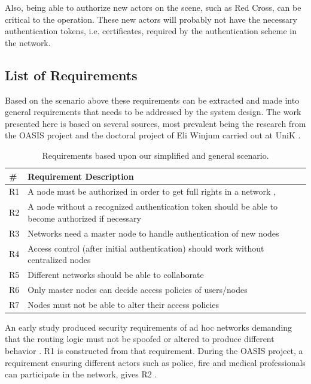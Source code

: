 Also, being able to authorize new actors on the scene, such as Red Cross, can be
critical to the operation. These new actors will probably not have the necessary
authentication tokens, i.e. certificates, required by the authentication scheme
in the network.

\subsection{List of Requirements}
Based on the scenario above these requirements can be extracted and made into
general requirements that needs to be addressed by the system design. The work
presented here is based on several sources, most prevalent being the research
from the OASIS project \cite{oasis_report} \cite{5683058} \cite{nyre2009secure}
and the doctoral project of Eli Winjum carried out at UniK
\cite{ffi_2005_04015}.

\begin{table}[ht!]
	\centering
	\begin{tabular*}{\textwidth}{ | p{5mm} | p{388pt} | }
	\hline
	\textbf{\#} & \textbf{Requirement Description}\\\hline
		R1 & A node must be authorized in order to get full rights in a network \cite{dahill2001secure}, \cite{sanzgiri2002secure}\\\hline
		R2 & A node without a recognized authentication token should be able to become authorized if necessary\\\hline
		R3 & Networks need a master node to handle authentication of new nodes\\\hline
		R4 & Access control (after initial authentication) should work without centralized nodes\\\hline
		R5 & Different networks should be able to collaborate \cite{ffi_2005_04015}\\\hline
		R6 & Only master nodes can decide access policies of users/nodes\\\hline
		R7 & Nodes must not be able to alter their access policies\\\hline
	\end{tabular*}
	\caption{Requirements based upon our simplified and general scenario.}
	\label{tab:our_req}
\end{table}

An early study produced security requirements of ad hoc networks demanding
that the routing logic must not be spoofed or altered to produce different
behavior \cite{dahill2001secure}. R1 is constructed from that requirement.
During the OASIS project, a requirement ensuring different actors such as
police, fire and medical professionals can participate in the network, gives R2
\cite{5683058}.

